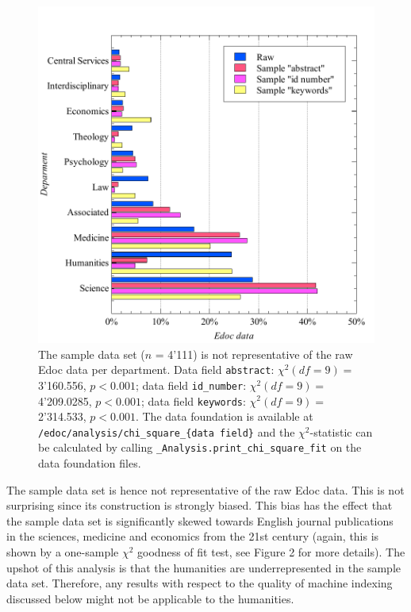 \begin{figure}
\centering
\includegraphics{images/chi_square_selection_fields.pdf}
\caption{The sample data set (\(n\) = 4'111) is not representative of
the raw Edoc data per department. Data field \texttt{abstract}:
\(\chi^2 (df=9) =\) 3'160.556, \(p < 0.001\); data field
\texttt{id\_number}: \(\chi^2 (df=9) =\) 4'209.0285, \(p < 0.001\); data
field \texttt{keywords}: \(\chi^2 (df=9) =\) 2'314.533, \(p < 0.001\).
The data foundation is available at
\texttt{/edoc/analysis/chi\_square\_\{data\ field\}} and the
\(\chi^2\)-statistic can be calculated by calling
\texttt{\_Analysis.print\_chi\_square\_fit} on the data foundation
files.}
\end{figure}

The sample data set is hence not representative of the raw Edoc data.
This is not surprising since its construction is strongly biased. This
bias has the effect that the sample data set is significantly skewed
towards English journal publications in the sciences, medicine and
economics from the 21st century (again, this is shown by a one-sample
\(\chi^2\) goodness of fit test, see Figure 2 for more details). The
upshot of this analysis is that the humanities are underrepresented in
the sample data set. Therefore, any results with respect to the quality
of machine indexing discussed below might not be applicable to the
humanities.

